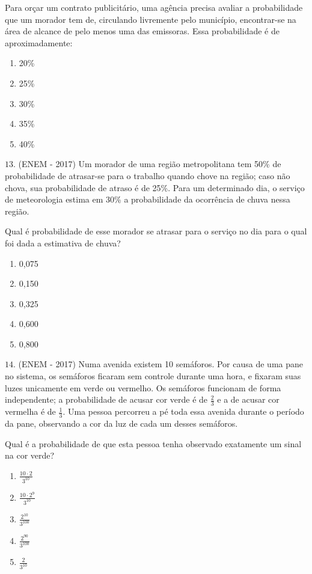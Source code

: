 Para orçar um contrato publicitário, uma agência precisa avaliar a probabilidade que um morador tem de, circulando livremente pelo município, encontrar-se na área de alcance de pelo menos uma das emissoras. Essa probabilidade é de aproximadamente:
\begin{enumerate}
\item {} 
20\%

\item {} 
25\%

\item {} 
30\%

\item {} 
35\%

\item {} 
40\%

\end{enumerate}

\(13.\) (ENEM - 2017) Um morador de uma região metropolitana tem 50\% de probabilidade de atrasar-se para o trabalho quando chove na região; caso não chova, sua probabilidade de atraso é de 25\%. Para um determinado dia, o serviço de meteorologia estima em 30\% a probabilidade da ocorrência de chuva nessa região.

Qual é probabilidade de esse morador se atrasar para o serviço no dia para o qual foi dada a estimativa de chuva?
\begin{enumerate}
\item {} 
0,075

\item {} 
0,150

\item {} 
0,325

\item {} 
0,600

\item {} 
0,800

\end{enumerate}

\(14.\) (ENEM - 2017) Numa avenida existem 10 semáforos. Por causa de uma pane no sistema, os semáforos ficaram sem controle durante uma hora, e fixaram suas luzes unicamente em verde ou vermelho. Os semáforos funcionam de forma independente; a probabilidade de acusar cor verde é de \(\frac{2}{3}\) e a de acusar cor vermelha é de \(\frac{1}{3}\). Uma pessoa percorreu a pé toda essa avenida durante o período da pane, observando a cor da luz de cada um desses semáforos.

Qual é a probabilidade de que esta pessoa tenha observado exatamente um sinal na cor verde?
\begin{enumerate}
\item {} 
\(\frac{10\cdot 2}{3^{10}}\)

\item {} 
\(\frac{10\cdot 2^9}{3^{10}}\)

\item {} 
\(\frac{2^{10}}{3^{100}}\)

\item {} 
\(\frac{2^{90}}{3^{100}}\)

\item {} 
\(\frac{2}{3^{10}}\)

\end{enumerate}

